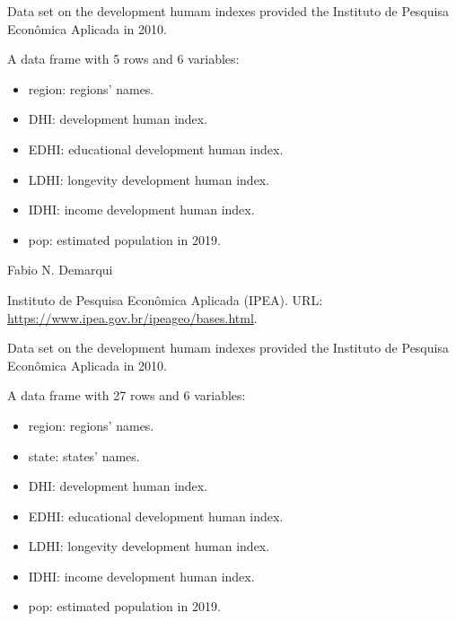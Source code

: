 \documentclass[letterpaper]{book}
\begin{document}
%
\begin{Description}\relax
Data set on the development humam indexes provided the Instituto de Pesquisa Econômica Aplicada in 2010.
\end{Description}
%
\begin{Format}
A data frame with 5 rows and 6 variables:
\begin{itemize}

\item{} region: regions' names.
\item{} DHI: development human index.
\item{} EDHI: educational development human index.
\item{} LDHI: longevity development human index.
\item{} IDHI: income development human index.
\item{} pop: estimated population in 2019.

\end{itemize}

\end{Format}
%
\begin{Author}\relax
Fabio N. Demarqui 
\end{Author}
%
\begin{Source}\relax
Instituto de Pesquisa Econômica Aplicada (IPEA). URL: \url{https://www.ipea.gov.br/ipeageo/bases.html}.
\end{Source}
%
\begin{Description}\relax
Data set on the development humam indexes provided the Instituto de Pesquisa Econômica Aplicada in 2010.
\end{Description}
%
\begin{Format}
A data frame with 27 rows and 6 variables:
\begin{itemize}

\item{} region: regions' names.
\item{} state: states' names.
\item{} DHI: development human index.
\item{} EDHI: educational development human index.
\item{} LDHI: longevity development human index.
\item{} IDHI: income development human index.
\item{} pop: estimated population in 2019.

\end{itemize}

\end{Format}
\end{document}
